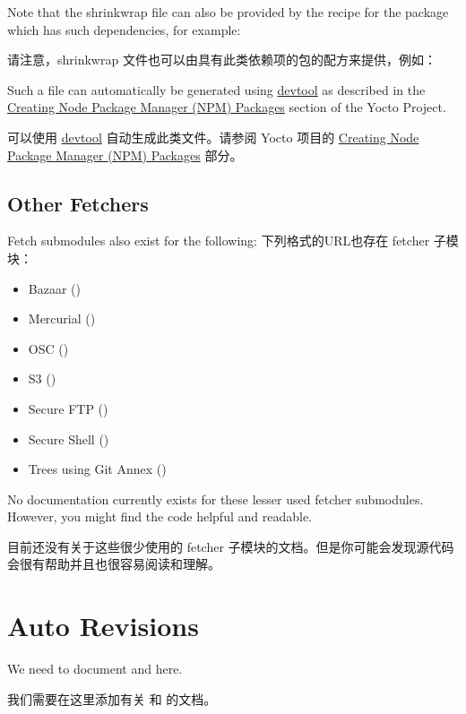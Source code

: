 Note that the shrinkwrap file can also be provided by the recipe for the package which has such dependencies, for example:

请注意，shrinkwrap 文件也可以由具有此类依赖项的包的配方来提供，例如：


Such a file can automatically be generated using \href{https://docs.yoctoproject.org/ref-manual/devtool-reference.html}{devtool} as described in the \href{https://docs.yoctoproject.org/dev-manual/packages.html#creating-node-package-manager-npm-packages}{Creating Node Package Manager (NPM) Packages} section of the Yocto Project.

可以使用 \href{https://docs.yoctoproject.org/ref-manual/devtool-reference.html}{devtool} 自动生成此类文件。请参阅 Yocto 项目的 \href{https://docs.yoctoproject.org/dev-manual/packages.html#creating-node-package-manager-npm-packages}{Creating Node Package Manager (NPM) Packages} 部分。

\subsection{Other Fetchers}
\label{section:Fetchers}

Fetch submodules also exist for the following:
下列格式的URL也存在 fetcher 子模块：

\begin{itemize}
\setlength\itemsep{1.0em}
\item Bazaar ()

\item Mercurial ()

\item OSC ()

\item S3 ()

\item Secure FTP ()

\item Secure Shell ()

\item Trees using Git Annex ()
\end{itemize}

No documentation currently exists for these lesser used fetcher submodules. However, you might find the code helpful and readable.

目前还没有关于这些很少使用的 fetcher 子模块的文档。但是你可能会发现源代码会很有帮助并且也很容易阅读和理解。

\section{Auto Revisions}

We need to document  and  here.

我们需要在这里添加有关  和  的文档。
